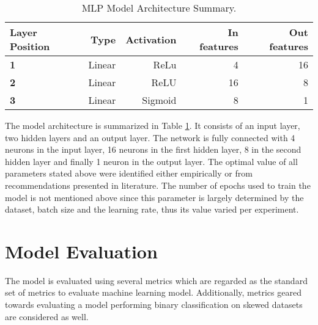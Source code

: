 \begin{table}[htb]
  \centering
  \caption{MLP Model Architecture Summary.}
  \begin{tabular}{lrrrr}
    \hline
    Layer Position & Type & Activation & In features & Out features \\
    \hline
    \textbf{1} & Linear & ReLu & 4 & 16 \\
    \textbf{2} & Linear & ReLU & 16 & 8 \\
    \textbf{3} & Linear & Sigmoid & 8 & 1 \\
    \hline
  \end{tabular}
  \label{tab:mlp-model-arch}
\end{table}

The model architecture is summarized in Table
\ref{tab:mlp-model-arch}. It consists of an input layer, two hidden
layers and an output layer. The network is fully connected with 4
neurons in the input layer, 16 neurons in the first hidden layer, 8 in
the second hidden layer and finally 1 neuron in the output layer. The
optimal value of all parameters stated above were identified either
empirically or from recommendations presented in literature. The
number of epochs used to train the model is not mentioned above since
this parameter is largely determined by the dataset, batch size and
the learning rate, thus its value varied per experiment.

\section{Model Evaluation}
\label{sec:mlp-model-eval}

The model is evaluated using several metrics which are regarded as the
standard set of metrics to evaluate machine learning model.
Additionally, metrics geared towards evaluating a model performing
binary classification on skewed datasets are considered as well.

